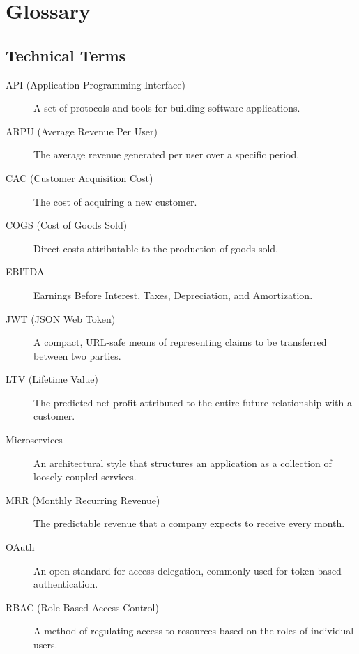 \chapter{Glossary}
\label{appendix:glossary}

\section{Technical Terms}

\begin{description}
    \item[API (Application Programming Interface)] A set of protocols and tools for building software applications.
    
    \item[ARPU (Average Revenue Per User)] The average revenue generated per user over a specific period.
    
    \item[CAC (Customer Acquisition Cost)] The cost of acquiring a new customer.
    
    \item[COGS (Cost of Goods Sold)] Direct costs attributable to the production of goods sold.
    
    \item[EBITDA] Earnings Before Interest, Taxes, Depreciation, and Amortization.
    
    \item[JWT (JSON Web Token)] A compact, URL-safe means of representing claims to be transferred between two parties.
    
    \item[LTV (Lifetime Value)] The predicted net profit attributed to the entire future relationship with a customer.
    
    \item[Microservices] An architectural style that structures an application as a collection of loosely coupled services.
    
    \item[MRR (Monthly Recurring Revenue)] The predictable revenue that a company expects to receive every month.
    
    \item[OAuth] An open standard for access delegation, commonly used for token-based authentication.
    
    \item[RBAC (Role-Based Access Control)] A method of regulating access to resources based on the roles of individual users.
    

\end{description}
